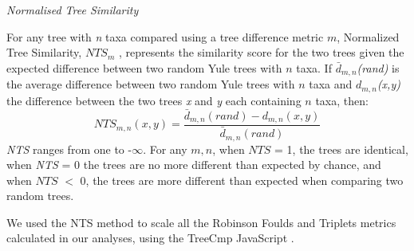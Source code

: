 \documentclass[12pt,letterpaper]{article}
\renewcommand{\subsection}[1]{%
\bigskip
\begin{center}
\begin{large}
\normalfont\itshape #1
\end{large}
\end{center}}
\begin{document}
\subsection{Normalised Tree Similarity}
For any tree with \textit{n} taxa compared using a tree difference metric $m$, Normalized Tree Similarity, $NTS_m$ \cite{Bogdanowicz2012}, represents the similarity score for the two trees given the expected difference between two random Yule trees \cite{Bogdanowicz2012} with $n$ taxa. If $\bar{d}_{m,n}$\textit{(rand)} is the average difference between two random Yule trees with $n$ taxa and $d_{m,n}$\textit{(x,y)} the difference between the two trees \textit{x} and \textit{y} each containing $n$ taxa, then:
\begin{equation}
NTS_{m,n}(x,y)=\frac{\bar{d}_{m,n}(rand) - d_{m,n}(x,y)} {\bar{d}_{m,n}(rand)}
\end{equation}
\textit{NTS} ranges from one to -$\infty$.
For any $m,n$, when $NTS$ = 1, the trees are identical, when \textit{NTS} = 0 the trees are no more different than expected by chance, and when $NTS$ $<$ 0, the trees are more different than expected when comparing two random trees. 

We used the NTS method to scale all the Robinson Foulds and Triplets metrics calculated in our analyses, using the TreeCmp JavaScript \cite{Bogdanowicz2012}.
\end{document}
